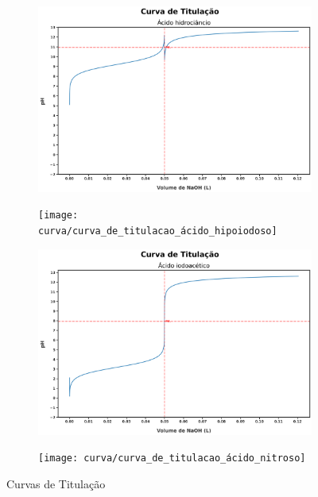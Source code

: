 \documentclass[a4paper, 12pt]{article}
\begin{document}
\begin{figure}
	\begin{subfigure}{0.5\textwidth}
		\centering
		\includegraphics[width=0.9\linewidth]{curva/curva_de_titulacao_ácido_hidrociâncio}
		\caption{}
		\label{fig:curvadetitulacaoácidohidrociâncio}
	\end{subfigure}
	\begin{subfigure}{0.5\textwidth}
		\centering
		\texttt{[image: curva/curva\_de\_titulacao\_ácido\_hipoiodoso]}
		\caption{}
		\label{fig:curvadetitulacaoácidohipoiodoso}
	\end{subfigure}
	\begin{subfigure}{0.5\textwidth}
		\centering
		\includegraphics[width=0.9\linewidth]{curva/curva_de_titulacao_ácido_iodoacético}
		\caption{}
		\label{fig:curvadetitulacaoácidoiodoacético}
	\end{subfigure}
	\begin{subfigure}{0.5\textwidth}
		\centering
		\texttt{[image: curva/curva\_de\_titulacao\_ácido\_nitroso]}
		\caption{}
		\label{fig:curvadetitulacaoácidonitroso}
	\end{subfigure}
	\caption{Curvas de Titulação}
	\label{fig:curvas_de_titulacao}
\end{figure}
		
\end{document}
